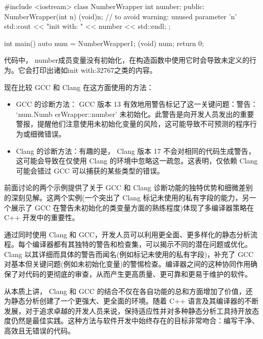 \begin{cpp}
#include <iostream>
class NumberWrapper {
    int number;
    public:
    NumberWrapper(int n) {
        (void)n; // to avoid warning: unused parameter 'n'
        std::cout << "init with: " << number << std::endl;
    }
};

int main() {
    auto num = NumberWrapper{1};
    (void) num;
    return 0;
}
\end{cpp}

代码中， number成员变量没有初始化，在构造函数中使用它时会导致未定义的行为。它会打印出诸如init with:32767之类的内容。

现在比较 GCC 和 Clang 在这方面使用的方法：

\begin{itemize}
\item
GCC 的诊断方法： GCC 版本 13 有效地用警告标记了这一关键问题：警告： ‘num.Numb erWrapper::number’ 未初始化。此警告是向开发人员发出的重要警报，提醒他们注意使用未初始化变量的风险，这可能导致不可预测的程序行为或细微错误。

\item
Clang 的诊断方法：有趣的是， Clang 版本 17 不会对相同的代码生成警告，这可能会导致在仅使用 Clang 的环境中忽略这一疏忽。这表明，仅依赖 Clang 可能会错过 GCC 可以捕获的某些类型的错误。
\end{itemize}

前面讨论的两个示例提供了关于 GCC 和 Clang 诊断功能的独特优势和细微差别的深刻见解。这两个实例(一个突出了 Clang 标记未使用的私有字段的能力，另一个展示了 GCC 在警告未初始化的类变量方面的熟练程度)体现了多编译器策略在 C++ 开发中的重要性。

通过同时使用 Clang 和 GCC，开发人员可以利用更全面、更多样化的静态分析流程。每个编译器都有其独特的警告和检查集，可以揭示不同的潜在问题或优化。 Clang 以其详细而具体的警告而闻名(例如标记未使用的私有字段)，补充了 GCC 对基本但关键问题(例如未初始化变量)的警惕检查。编译器之间的这种协同作用确保了对代码的更彻底的审查，从而产生更高质量、更可靠和更易于维护的软件。

从本质上讲， Clang 和 GCC 的结合不仅在各自功能的总和方面增加了价值，还为静态分析创建了一个更强大、更全面的环境。随着 C++ 语言及其编译器的不断发展，对于追求卓越的开发人员来说，保持适应性并对多种静态分析工具持开放态度仍然是最佳实践。这种方法与软件开发中始终存在的目标非常吻合：编写干净、高效且无错误的代码。
















